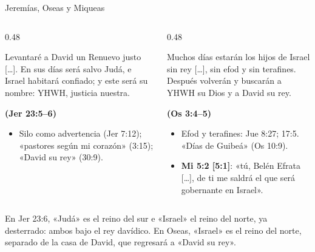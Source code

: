 \documentclass[hyperref={bookmarks=false},aspectratio=169]{beamer}
\newcommand{\fuente}[1]{\par\hfill{\upshape\bfseries\footnotesize\textcolor{ladrillo}{#1}}}
\begin{document}
\begin{frame}{Jeremías, Oseas y Miqueas}
\begin{columns}[T,onlytextwidth]
\begin{column}{0.48\textwidth}
\begin{cita}[fontupper=\scriptsize\itshape]Levantaré a David un Renuevo justo [\ldots]. En sus días será salvo Judá, e Israel habitará confiado; y este será su nombre: YHWH, justicia nuestra.\fuente{(Jer 23:5--6)}\end{cita}
\scriptsize
\begin{itemize}
\item Silo como advertencia (Jer 7:12); «pastores según mi corazón» (3:15); «David su rey» (30:9).
\end{itemize}
\end{column}
\begin{column}{0.48\textwidth}
\begin{cita}[fontupper=\scriptsize\itshape]Muchos días estarán los hijos de Israel sin rey [\ldots], sin efod y sin terafines. Después volverán y buscarán a YHWH su Dios y a David su rey.\fuente{(Os 3:4--5)}\end{cita}
\scriptsize
\begin{itemize}
\item Efod y terafines: Jue 8:27; 17:5. «Días de Guibeá» (Os 10:9).
\item \textbf{Mi 5:2 [5:1]}: «tú, Belén Efrata [\ldots], de ti me saldrá el que será gobernante en Israel».
\end{itemize}
\end{column}
\end{columns}
\vspace{2pt}
\begin{notalam}
En Jer 23:6, «Judá» es el reino del sur e «Israel» el reino del norte, ya desterrado: ambos bajo el rey davídico. En Oseas, «Israel» es el reino del norte, separado de la casa de David, que regresará a «David su rey».
\end{notalam}
\end{frame}
\end{document}
